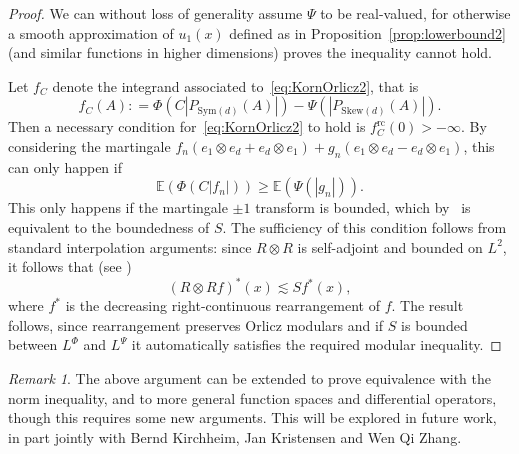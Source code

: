 \documentclass[11pt, a4paper]{amsart}
\theoremstyle{definition}
\theoremstyle{remark}
\newtheorem{remark}{Remark}
\begin{document}
\begin{proof}
We can without loss of generality assume $\Psi$
to be real-valued, for otherwise a smooth 
approximation of $u_1(x)$ defined as
in Proposition~\ref{prop:lowerbound2}
(and similar functions 
in higher dimensions)
proves the inequality cannot hold.

Let $f_C$ denote the integrand associated
to~\eqref{eq:KornOrlicz2},
that is
\[
f_C(A)\mathrel{:}=
\Phi(C |P_{\mathrm{Sym}(d)}(A)|)
-\Psi(|P_{\mathrm{Skew}(d)}(A)|).
\]
Then a necessary condition for~\eqref{eq:KornOrlicz2} to hold is
$f_C^{\mathrm{rc}}(0)>-\infty$.
By considering the martingale
$f_n (e_1\otimes e_d+e_d\otimes e_1)+
g_n (e_1\otimes e_d-e_d\otimes e_1)$,
this can only happen if
\begin{equation*}
\mathbb E(\Phi(C |f_n|))\ge \mathbb E(\Psi(|g_n|)).
\end{equation*}
This only happens if the martingale $\pm1$ transform is bounded, 
which by~\cite{Astashkin2023} is equivalent to the
boundedness of $S$. The sufficiency of this condition follows
from standard interpolation arguments:
since $R\otimes R$ is self-adjoint
and bounded on $L^2$, it follows that
(see \cite[Appendix]{Calderon1966}) 
\[(R\otimes R f)^*(x)\lesssim S f^*(x),\]
where $f^*$ is the decreasing right-continuous
rearrangement of $f$.
The result follows, since rearrangement
preserves Orlicz modulars and if $S$
is bounded between $L^{\Phi}$ and $L^{\Psi}$
it automatically satisfies the required modular inequality.
\end{proof}
\begin{remark}
The above argument can be extended
to prove equivalence with the norm
inequality, and to more general function spaces and
differential operators, though
this requires some new arguments.
This will be explored in future work, 
in part jointly with Bernd Kirchheim, Jan 
Kristensen and Wen Qi Zhang.
\end{remark}
\end{document}
